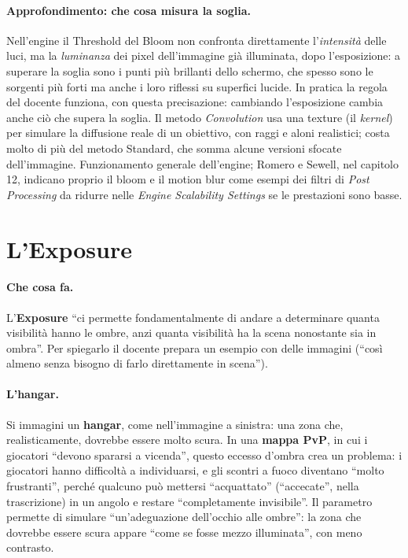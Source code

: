 \paragraph{Approfondimento: che cosa misura la soglia.} Nell'engine il Threshold del Bloom
non confronta direttamente l'\emph{intensità} delle luci, ma la \emph{luminanza} dei pixel
dell'immagine già illuminata, dopo l'esposizione: a superare la soglia sono i punti più
brillanti dello schermo, che spesso sono le sorgenti più forti ma anche i loro riflessi su
superfici lucide. In pratica la regola del docente funziona, con questa precisazione:
cambiando l'esposizione cambia anche ciò che supera la soglia. Il metodo \emph{Convolution}
usa una texture (il \emph{kernel}) per simulare la diffusione reale di un obiettivo, con
raggi e aloni realistici; costa molto di più del metodo Standard, che somma alcune versioni
sfocate dell'immagine. Funzionamento generale dell'engine; Romero e Sewell, nel capitolo 12,
indicano proprio il bloom e il motion blur come esempi dei filtri di \emph{Post Processing}
da ridurre nelle \emph{Engine Scalability Settings} se le prestazioni sono basse.

\section{L'Exposure}
\label{ue16:sec:exposure}

\paragraph{Che cosa fa.} L'\textbf{Exposure} ``ci permette fondamentalmente di andare a
determinare quanta visibilità hanno le ombre, anzi quanta visibilità ha la scena nonostante
sia in ombra''. Per spiegarlo il docente prepara un esempio con delle immagini (``così almeno
senza bisogno di farlo direttamente in scena'').

\paragraph{L'hangar.} Si immagini un \textbf{hangar}, come nell'immagine a sinistra: una zona
che, realisticamente, dovrebbe essere molto scura. In una \textbf{mappa PvP}, in cui i
giocatori ``devono spararsi a vicenda'', questo eccesso d'ombra crea un problema: i giocatori
hanno difficoltà a individuarsi, e gli scontri a fuoco diventano ``molto frustranti'', perché
qualcuno può mettersi ``acquattato'' (``accecate'', nella trascrizione) in un angolo e restare
``completamente invisibile''. Il parametro permette di simulare ``un'adeguazione dell'occhio
alle ombre'': la zona che dovrebbe essere scura appare ``come se fosse mezzo illuminata'', con
meno contrasto.

